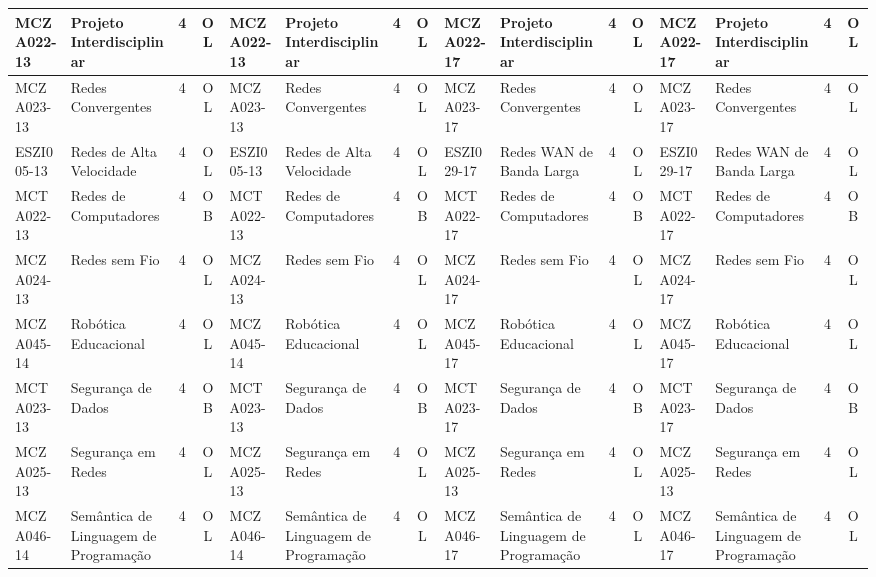\documentclass[a4paper]{article}
\begin{document}
\begin{landscape}
{\begin{longtable}{|l|p{.15\textheight}|c|c||l|p{.15\textheight}|c|c||l|p{.15\textheight}|c|c||l|p{.15\textheight}|c|c|}
    MCZA022-13 & Projeto Interdisciplinar & 4 & OL &
    MCZA022-13 & Projeto Interdisciplinar & 4 & OL &
    MCZA022-17 & Projeto Interdisciplinar & 4 & OL &  
    MCZA022-17 & Projeto Interdisciplinar & 4 & OL \\ \hline

    MCZA023-13 & Redes Convergentes & 4 & OL &
    MCZA023-13 & Redes Convergentes & 4 & OL &
    MCZA023-17 & Redes Convergentes & 4 & OL &
    MCZA023-17 & Redes Convergentes & 4 & OL \\ \hline

    ESZI005-13 & Redes de Alta Velocidade & 4 & OL &
    ESZI005-13 & Redes de Alta Velocidade & 4 & OL &
    ESZI029-17 & Redes WAN de Banda Larga & 4 & OL &
    ESZI029-17 & Redes WAN de Banda Larga & 4 & OL \\ \hline

    MCTA022-13 & Redes de Computadores & 4 & OB & 
    MCTA022-13 & Redes de Computadores & 4 & OB &
    MCTA022-17 & Redes de Computadores & 4 & OB & 
    MCTA022-17 & Redes de Computadores & 4 & OB \\ \hline

    MCZA024-13 & Redes sem Fio & 4 & OL &
    MCZA024-13 & Redes sem Fio & 4 & OL &
    MCZA024-17 & Redes sem Fio & 4 & OL &
    MCZA024-17 & Redes sem Fio & 4 & OL \\ \hline

    MCZA045-14 & Robótica Educacional & 4 & OL &
    MCZA045-14 & Robótica Educacional & 4 & OL &
    MCZA045-17 & Robótica Educacional & 4 & OL &
    MCZA045-17 & Robótica Educacional & 4 & OL \\ \hline
   
    MCTA023-13 & Segurança de Dados & 4 & OB & 
    MCTA023-13 & Segurança de Dados & 4 & OB & 
    MCTA023-17 & Segurança de Dados & 4 & OB & 
    MCTA023-17 & Segurança de Dados & 4 & OB \\ \hline

    MCZA025-13 & Segurança em Redes & 4 & OL &
    MCZA025-13 & Segurança em Redes & 4 & OL &
    MCZA025-13 & Segurança em Redes & 4 & OL & 
    MCZA025-13 & Segurança em Redes & 4 & OL \\ \hline

    MCZA046-14 & Semântica de Linguagem de Programação & 4 & OL &
    MCZA046-14 & Semântica de Linguagem de Programação & 4 & OL &
    MCZA046-17 & Semântica de Linguagem de Programação & 4 & OL &
    MCZA046-17 & Semântica de Linguagem de Programação & 4 & OL \\ \hline


\end{longtable}}
\end{landscape}
\end{document}
